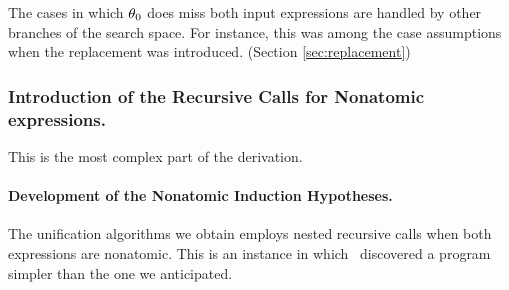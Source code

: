 \documentclass[runningheads]{llncs}
\begin{document}
The cases in which $\theta_{0}$ does miss both input expressions are handled by other branches of the search space. For instance, this was among the case assumptions when the replacement was introduced. (Section \ref{sec:replacement}) 

\subsubsection{Introduction of the Recursive Calls for Nonatomic expressions.}

This is the most complex part of the derivation. \paragraph{Development of the Nonatomic Induction Hypotheses.}\label{par:nonatomicindhyp} The unification algorithms we obtain employs nested recursive calls when both expressions are nonatomic. This is an instance in which \SNARK\ discovered a program simpler than the one we  anticipated.
\end{document}
